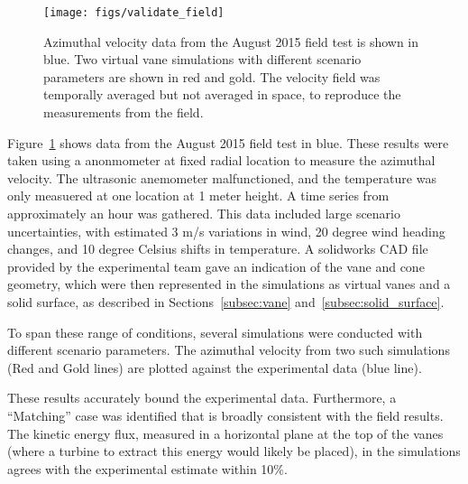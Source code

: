  \begin{figure}[!htb]
  \begin{center}
   \texttt{[image: figs/validate\_field]}
   \caption{Azimuthal velocity data from the August 2015 field test is
   shown in blue. Two virtual vane simulations with different scenario
   parameters are shown in red and gold. The velocity field was
   temporally averaged but not averaged in space, to reproduce
   the measurements from the field.}
   \label{fig:field_val}
  \end{center}
 \end{figure}
%
%

Figure~\ref{fig:field_val} shows data from the August 2015 field test in
blue. These results were taken using a anonmometer at fixed radial
location to measure the azimuthal velocity. The ultrasonic anemometer
malfunctioned, and the temperature was only measuered at one location at
1 meter height. A time series from approximately an hour was gathered. 
This data included large scenario uncertainties, with estimated 3
m/s variations in wind, 20 degree wind heading changes, and 10 degree
Celsius shifts in temperature. A solidworks CAD file provided by the
experimental team gave an indication of the vane and cone geometry,
which were then represented in the simulations as virtual vanes and a
solid surface, as described in 
Sections~\ref{subsec:vane} and~\ref{subsec:solid_surface}.   

To span these range of conditions, several simulations were conducted
with different scenario parameters. The azimuthal velocity from two such
simulations (Red and Gold lines) are plotted against the experimental
data (blue line).  

These results accurately bound the experimental data. Furthermore, a
``Matching'' case was identified that is broadly consistent with the
field results. The kinetic energy flux, measured in a horizontal plane
at the top of the vanes (where a turbine to extract this energy would
likely be placed), in the simulations agrees with the experimental
estimate within 10\%. 


%
% 
%
% 
%
%
%
%
